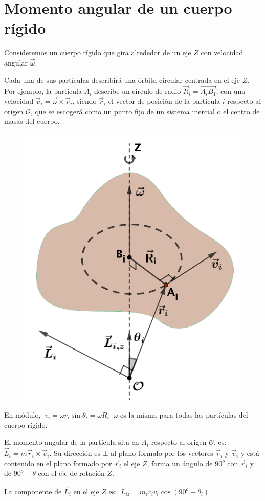 \section{Momento angular de un cuerpo rígido}

\begin{multicols}{2}
Consideremos un cuerpo rígido que gira alrededor de un eje $Z$ con velocidad angular $\vec \omega$.

Cada una de sus partículas describirá una órbita circular centrada en el eje $Z$. Por ejemplo, la partícula $A_i$ describe un círculo de radio $\vec R_i=\overrightarrow{A_iB_1}$, con una velocidad $\vec v_i=\vec \omega \times \vec r_i$, siendo $\vec r_i$ el vector de posición de la partícula $i$ respecto al origen $\mathcal O$, que se escogerá como un punto fijo de un sistema inercial o el centro de masas del cuerpo.
\begin{figure}[H]
	\centering
	\includegraphics[width=.5\textwidth]{imagenes/imagenes16/T16IM02.png}
\end{figure}
\end{multicols}

En módulo, $\ v_i=\omega r_i \sin \theta_i=\omega R_i$ \textcolor{gris}{$\ \omega$ es la misma para todas las partículas del cuerpo rígido.}

El momento angular de la partícula sita en $A_i$ respecto al origen $\mathcal O$, es:
$\vec L_i=m\vec r_i \times \vec v_i$. Su dirección es $\bot$ al plano formafo por los vectores $\vec r_i \text{ y } \vec v_i$ y está contenido en el plano formado por $\vec r_i$ el eje $Z$, forma un ángulo de $90^o$ con $\vec r_i$ y de $90^o - \theta$ con el eje de rotación $Z$.

La componente de $\vec L_i$ en el eje $Z$ es: $\ L_{iz}=m_ir_iv_i \cos (90^o-\theta_i)$

